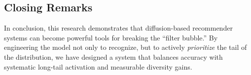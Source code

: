 \documentclass[11pt,a4paper]{article}
\begin{document}
\subsection{Closing Remarks}
In conclusion, this research demonstrates that diffusion-based recommender systems can become powerful tools for breaking the ``filter bubble.'' By engineering the model not only to recognize, but to actively \emph{prioritize} the tail of the distribution, we have designed a system that balances accuracy with systematic long-tail activation and measurable diversity gains.
\end{document}
